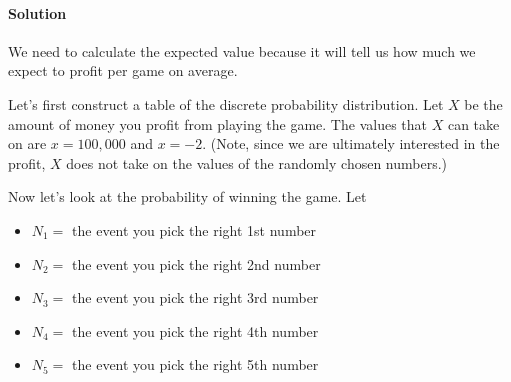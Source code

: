 \documentclass[letterpaper,10pt,english]{jupyterBook}
\begin{document}
\paragraph{Solution}
\label{\detokenize{Ch3 Probability/3.5 Discrete Probability Distributions:id4}}
\sphinxAtStartPar
We need to calculate the expected value because it will tell us how much we expect to profit per game on average.

\sphinxAtStartPar
Let’s first construct a table of the discrete probability distribution. Let \(X\) be the amount of money you profit from playing the game. The values that \(X\) can take on are \(x = 100{,}000\) and \(x = -2\). (Note, since we are ultimately interested in the profit, \(X\) does not take on the values of the randomly chosen numbers.)

\sphinxAtStartPar
Now let’s look at the probability of winning the game. Let
\begin{itemize}
\item {} 
\sphinxAtStartPar
\(N_1 =\) the event you pick the right 1st number

\item {} 
\sphinxAtStartPar
\(N_2 =\) the event you pick the right 2nd number

\item {} 
\sphinxAtStartPar
\(N_3 =\) the event you pick the right 3rd number

\item {} 
\sphinxAtStartPar
\(N_4 =\) the event you pick the right 4th number

\item {} 
\sphinxAtStartPar
\(N_5 =\) the event you pick the right 5th number

\end{itemize}
\end{document}

